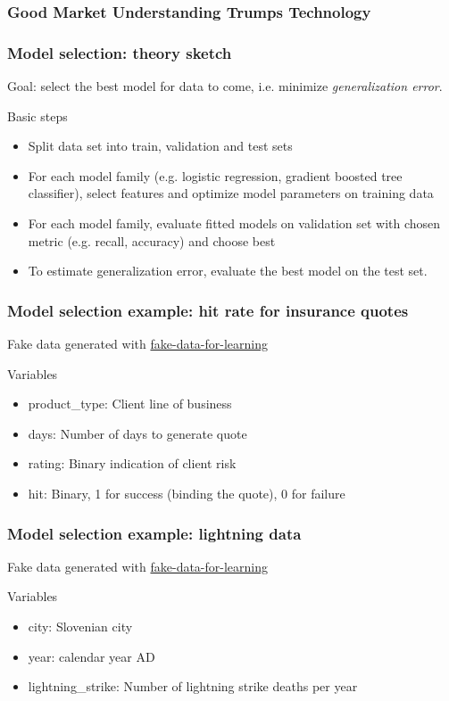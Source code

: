 \begin{frame}
\frametitle{Good Market Understanding Trumps Technology}
\centering
{}
\end{frame}

\begin{frame}
  \frametitle{Model selection: theory sketch}
  Goal: select the best model for data to come, i.e. minimize \emph{generalization error}.\newline

  Basic steps
  \begin{itemize}
    \item {\color{blue}Split data} set into train, validation and test sets
    \item For each model family (e.g. logistic regression, gradient boosted tree classifier), {\color{blue}select features} and {\color{blue}optimize model parameters} on training data
    \item For each model family, {\color{blue}evaluate fitted models} on validation set with chosen metric (e.g. recall, accuracy) and choose best
    \item To {\color{blue}estimate generalization error}, evaluate the best model on the test set.
  \end{itemize}
\end{frame}

\begin{frame}
\frametitle{Model selection example: hit rate for insurance quotes}
Fake data generated with \href{https://munichpavel.github.io/fake-data-for-learning/}{fake-data-for-learning}\newline

 \newline

 Variables
\begin{itemize}
\item product\_type: Client line of business
\item days: Number of days to generate quote
\item rating: Binary indication of client risk
\item hit: Binary, 1 for success (binding the quote), 0 for failure
\end{itemize}
\end{frame}


\begin{frame}
\frametitle{Model selection example: lightning data}
Fake data generated with \href{https://munichpavel.github.io/fake-data-for-learning/}{fake-data-for-learning}\newline

 \newline

 Variables
\begin{itemize}
\item city: Slovenian city
\item year: calendar year AD
\item lightning\_strike: Number of lightning strike deaths per year
\end{itemize}
\end{frame}

